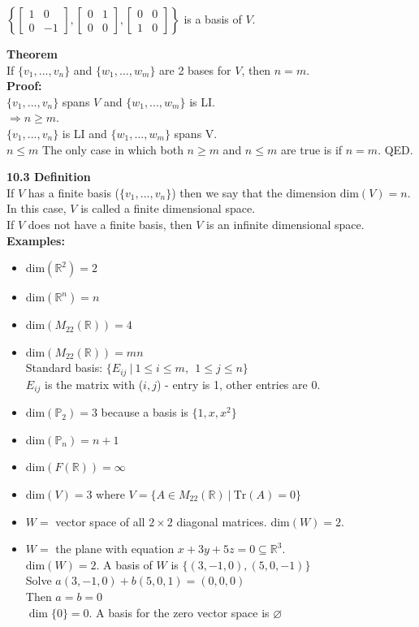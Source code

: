 \documentclass[]{article}
\let\emptyset\varnothing
\begin{document}
\begin{enumerate}
\begin{enumerate}
				$\left\{\begin{bmatrix}{1}&{0}\\{0}&{-1}\end{bmatrix},\begin{bmatrix}{0}&{1}\\{0}&{0}\end{bmatrix},\begin{bmatrix}{0}&{0}\\{1}&{0}\end{bmatrix}\right\}$ is a basis of $V$.
			\end{enumerate}
			\large{\bf Theorem}\\
			\normalsize If $\{v_1,...,v_n\}$ and $\{w_1,...,w_m\}$ are 2 bases for $V$, then $n=m$.\\
			{\bf Proof:}\\
			$\{v_1,...,v_n\}$ spans $V$ and $\{w_1,...,w_m\}$ is LI.\\
			$\Rightarrow n\ge m$.\\
			$\{v_1,...,v_n\}$ is LI and $\{w_1,...,w_m\}$ spans V.\\
			$n\le m$
			The only case in which both $n\ge m$ and $n\le m$ are true is if $n=m$. QED.
			\pagebreak\\			
		\end{enumerate}
		\large{\bf 10.3 Definition}\\
		\normalsize If $V$ has a finite basis ($\{v_1,...,v_n\}$) then we say that the dimension $\text{dim}(V)=n$. In this case, $V$ is called a finite dimensional space.\\
		If $V$ does not have a finite basis, then $V$ is an infinite dimensional space.\\
		{\bf Examples:}
		\begin{itemize}
			\item dim$(\mathbb{R}^2)=2$
			\item dim$(\mathbb{R}^n)=n$
			\item dim$(M_{22}(\mathbb{R}))=4$
			\item dim$(M_{22}(\mathbb{R}))=mn$\\
			Standard basis: $\{E_{ij}~|~1\le i\le m,~~1\le j\le n\}$\\
			$E_{ij}$ is the matrix with ($i,j$) - entry is 1, other entries are 0.
			\item dim$(\mathbb{P}_2)=3$ because a basis is $\{1,x,x^2\}$
			\item dim$(\mathbb{P}_n)=n+1$
			\item dim$(F(\mathbb{R}))=\infty$
			\item dim$(V)=3$ where $V=\{A\in M_{22}(\mathbb{R})~|~\text{Tr}(A)=0\}$
			\item $W=$ vector space of all $2\times 2$ diagonal matrices. dim$(W)=2$.
			\item $W=$ the plane with equation $x+3y+5z=0\subseteq\mathbb{R}^3$.\\
			dim$(W)=2$. A basis of $W$ is $\{(3,-1,0),(5,0,-1)\}$\\
			Solve $a(3,-1,0)+b(5,0,1)=(0,0,0)$\\
			Then $a=b=0$\\
			$\dim\{0\}=0$. A basis for the zero vector space is $\emptyset$
		\end{itemize}
\end{document}
